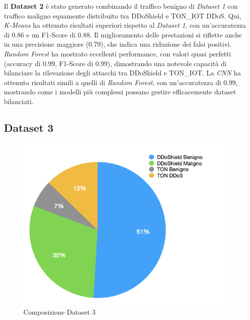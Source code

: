 Il \textbf{Dataset 2} è stato generato combinando il traffico benigno di \textit{Dataset 1} con traffico maligno equamente distribuito tra DDoShield e TON\_IOT DDoS. Qui, \textit{K-Means} ha ottenuto risultati superiori rispetto al \textit{Dataset 1}, con un'accuratezza di 0.86 e un F1-Score di 0.88. Il miglioramento delle prestazioni si riflette anche in una precisione maggiore (0.79), che indica una riduzione dei falsi positivi.
\textit{Random Forest} ha mostrato eccellenti performance, con valori quasi perfetti (accuracy di 0.99, F1-Score di 0.99), dimostrando una notevole capacità di bilanciare la rilevazione degli attacchi tra DDoShield e TON\_IOT.
La \textit{CNN} ha ottenuto risultati simili a quelli di \textit{Random Forest}, con un'accuratezza di 0.99, mostrando come i modelli più complessi possano gestire efficacemente dataset bilanciati.

\subsection{Dataset 3}

\begin{figure}[htbp]
\centering
\includegraphics[scale= 0.8]{UNINA_MSc_Thesis_Project/img/chapterRisulati/composizione_DATASET_3.png}
  \caption{Composizione Dataset 3}
\end{figure}

